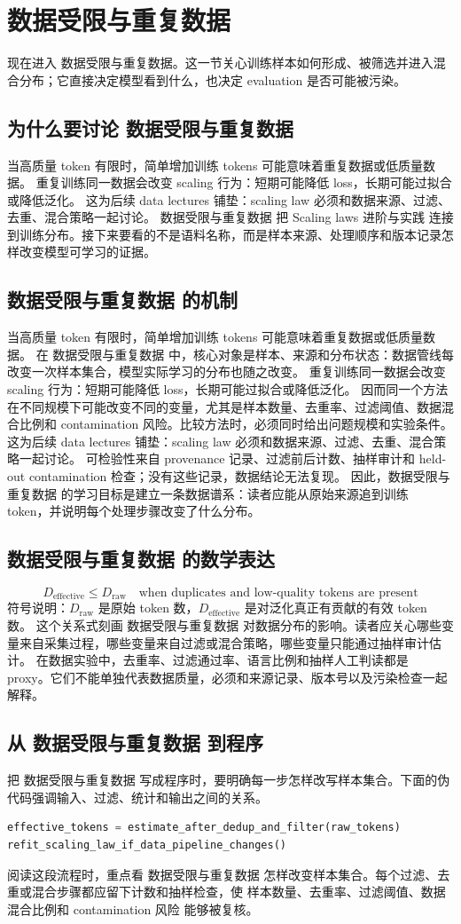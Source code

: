 \documentclass[a4paper]{article}
\begin{document}
\section{数据受限与重复数据}
现在进入 数据受限与重复数据。这一节关心训练样本如何形成、被筛选并进入混合分布；它直接决定模型看到什么，也决定 evaluation 是否可能被污染。
\subsection{为什么要讨论 数据受限与重复数据}
当高质量 token 有限时，简单增加训练 tokens 可能意味着重复数据或低质量数据。
重复训练同一数据会改变 scaling 行为：短期可能降低 loss，长期可能过拟合或降低泛化。
这为后续 data lectures 铺垫：scaling law 必须和数据来源、过滤、去重、混合策略一起讨论。
数据受限与重复数据 把 Scaling laws 进阶与实践 连接到训练分布。接下来要看的不是语料名称，而是样本来源、处理顺序和版本记录怎样改变模型可学习的证据。
\subsection{数据受限与重复数据 的机制}
当高质量 token 有限时，简单增加训练 tokens 可能意味着重复数据或低质量数据。 在 数据受限与重复数据 中，核心对象是样本、来源和分布状态：数据管线每改变一次样本集合，模型实际学习的分布也随之改变。
重复训练同一数据会改变 scaling 行为：短期可能降低 loss，长期可能过拟合或降低泛化。 因而同一个方法在不同规模下可能改变不同的变量，尤其是样本数量、去重率、过滤阈值、数据混合比例和 contamination 风险。比较方法时，必须同时给出问题规模和实验条件。
这为后续 data lectures 铺垫：scaling law 必须和数据来源、过滤、去重、混合策略一起讨论。 可检验性来自 provenance 记录、过滤前后计数、抽样审计和 held-out contamination 检查；没有这些记录，数据结论无法复现。
因此，数据受限与重复数据 的学习目标是建立一条数据谱系：读者应能从原始来源追到训练 token，并说明每个处理步骤改变了什么分布。
\subsection{数据受限与重复数据 的数学表达}
\[D_{\text{effective}}\le D_{\text{raw}}\quad\text{when duplicates and low-quality tokens are present}\]
符号说明：\(D_{\text{raw}}\) 是原始 token 数，\(D_{\text{effective}}\) 是对泛化真正有贡献的有效 token 数。
这个关系式刻画 数据受限与重复数据 对数据分布的影响。读者应关心哪些变量来自采集过程，哪些变量来自过滤或混合策略，哪些变量只能通过抽样审计估计。
在数据实验中，去重率、过滤通过率、语言比例和抽样人工判读都是 proxy。它们不能单独代表数据质量，必须和来源记录、版本号以及污染检查一起解释。
\subsection{从 数据受限与重复数据 到程序}
把 数据受限与重复数据 写成程序时，要明确每一步怎样改写样本集合。下面的伪代码强调输入、过滤、统计和输出之间的关系。
\begin{lstlisting}[language=Python]
effective_tokens = estimate_after_dedup_and_filter(raw_tokens)
refit_scaling_law_if_data_pipeline_changes()
\end{lstlisting}
阅读这段流程时，重点看 数据受限与重复数据 怎样改变样本集合。每个过滤、去重或混合步骤都应留下计数和抽样检查，使 样本数量、去重率、过滤阈值、数据混合比例和 contamination 风险 能够被复核。
\end{document}
